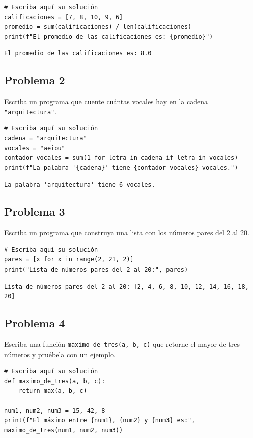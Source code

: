 \documentclass{article}
\begin{document}
\begin{verbatim}
# Escriba aquí su solución
calificaciones = [7, 8, 10, 9, 6]
promedio = sum(calificaciones) / len(calificaciones)
print(f"El promedio de las calificaciones es: {promedio}")
\end{verbatim}

\begin{verbatim}
El promedio de las calificaciones es: 8.0
\end{verbatim}

\subsection{Problema 2}
\label{sec:org342c81d}
Escriba un programa que cuente cuántas vocales hay en la cadena \texttt{"arquitectura"}.

\begin{verbatim}
# Escriba aquí su solución
cadena = "arquitectura"
vocales = "aeiou"
contador_vocales = sum(1 for letra in cadena if letra in vocales)
print(f"La palabra '{cadena}' tiene {contador_vocales} vocales.")
\end{verbatim}

\begin{verbatim}
La palabra 'arquitectura' tiene 6 vocales.
\end{verbatim}

\subsection{Problema 3}
\label{sec:orgd483933}
Escriba un programa que construya una lista con los números pares del 2 al 20.

\begin{verbatim}
# Escriba aquí su solución
pares = [x for x in range(2, 21, 2)]
print("Lista de números pares del 2 al 20:", pares)
\end{verbatim}

\begin{verbatim}
Lista de números pares del 2 al 20: [2, 4, 6, 8, 10, 12, 14, 16, 18, 20]
\end{verbatim}

\subsection{Problema 4}
\label{sec:orgc21f62d}
Escriba una función \texttt{maximo\_de\_tres(a, b, c)} que retorne el mayor de tres números y pruébela con un ejemplo.

\begin{verbatim}
# Escriba aquí su solución
def maximo_de_tres(a, b, c):
    return max(a, b, c)

num1, num2, num3 = 15, 42, 8
print(f"El máximo entre {num1}, {num2} y {num3} es:", maximo_de_tres(num1, num2, num3))
\end{verbatim}
\end{document}
